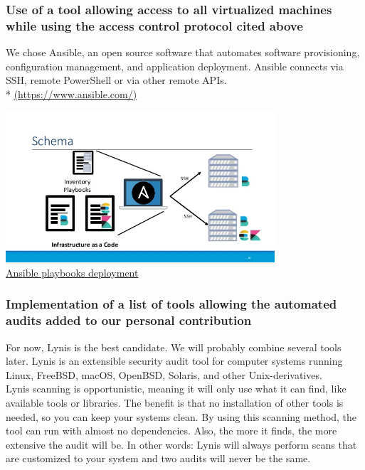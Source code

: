 \vspace{-1.3cm}
\subsubsection{Use of a tool allowing access to all virtualized machines while using the access control protocol cited above}
\vspace{0.5cm}

We chose Ansible, an open source software that automates software
provisioning, configuration management, and application deployment.
Ansible connects via SSH, remote PowerShell or via other remote APIs.\\ *
\url{(https://www.ansible.com/)}

\begin{center}

\includegraphics[width=0.75\textwidth]{images/ansible-example.jpg}
\\
\underline{Ansible playbooks deployment}

\end{center}

\pagebreak

\subsubsection{Implementation of a list of tools allowing the automated audits added to our
  personal contribution}

\vspace{0.3cm}
For now, Lynis is the best candidate. We will probably combine several tools later.
Lynis is an extensible security audit tool for computer systems
running Linux, FreeBSD, macOS, OpenBSD, Solaris, and other
Unix-derivatives.
\\

Lynis scanning is opportunistic, meaning it will only use what it can find, like available tools or libraries. The benefit is that no installation of other tools is needed, so you can keep your systems clean.
By using this scanning method, the tool can run with almost no dependencies. Also, the more it finds, the more extensive the audit will be. In other words: Lynis will always perform scans that are customized to your system and two audits will never be the same.
\\

